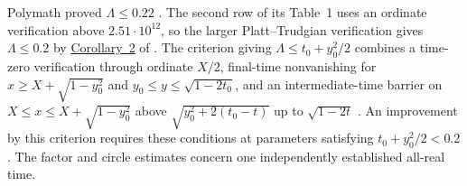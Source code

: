 Polymath proved \(\Lambda\le0.22\)
\cite[Theorem~1.1]{Polymath2019}. The second row of its
Table~1 uses an ordinate verification above \(2.51\cdot10^{12}\),
so the larger Platt--Trudgian verification gives \(\Lambda\le0.2\)
by \href{https://arxiv.org/pdf/2004.09765v1\#page=5}{Corollary~2}
of \cite{PlattTrudgian2021}. The criterion giving
\(\Lambda\le t_0+y_0^2/2\) combines a time-zero verification
through ordinate \(X/2\), final-time nonvanishing for
\(x\ge X+\sqrt{1-y_0^2}\) and \(y_0\le y\le\sqrt{1-2t_0}\),
and an intermediate-time barrier on
\(X\le x\le X+\sqrt{1-y_0^2}\) above
\(\sqrt{y_0^2+2(t_0-t)}\) up to \(\sqrt{1-2t}\)
\cite[Theorem~1.2]{Polymath2019}. An improvement by this
criterion requires these conditions at parameters satisfying
\(t_0+y_0^2/2<0.2\). The factor and circle estimates concern
one independently established all-real time.
